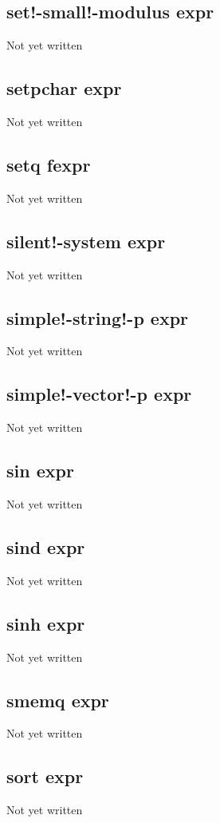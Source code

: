 \documentclass[a4paper,11pt]{article}
\begin{document}
{\subsection{\ttfamily set!-small!-modulus expr}
   Not yet written

\subsection{\ttfamily setpchar expr}
   Not yet written

\subsection{\ttfamily setq fexpr}
   Not yet written

\subsection{\ttfamily silent!-system expr}
   Not yet written

\subsection{\ttfamily simple!-string!-p expr}
   Not yet written

\subsection{\ttfamily simple!-vector!-p expr}
   Not yet written

\subsection{\ttfamily sin expr}
   Not yet written

\subsection{\ttfamily sind expr}
   Not yet written

\subsection{\ttfamily sinh expr}
   Not yet written

\subsection{\ttfamily smemq expr}
   Not yet written

\subsection{\ttfamily sort expr}
   Not yet written

}
\end{document}
